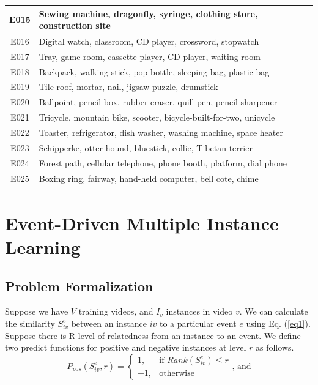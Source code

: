 \begin{table}
\begin{tabular}{|c|l|}
		E015              & Sewing machine, dragonfly, syringe, clothing store, construction site               \\ \midrule
		E016              & Digital watch, classroom, CD player, crossword, stopwatch                           \\ \midrule
		E017              & Tray, game room, cassette player, CD player, waiting room                           \\ \midrule
		E018              & Backpack, walking stick, pop bottle, sleeping bag, plastic bag                      \\ \midrule
		E019              & Tile roof, mortar, nail, jigsaw puzzle, drumstick                                   \\ \midrule
		E020              & Ballpoint, pencil box, rubber eraser, quill pen, pencil sharpener                   \\ \midrule
		E021              & Tricycle, mountain bike, scooter, bicycle-built-for-two, unicycle                   \\ \midrule
		E022              & Toaster, refrigerator, dish washer, washing machine, space heater                   \\ \midrule
		E023              & Schipperke, otter hound, bluestick, collie, Tibetan terrier                         \\ \midrule
		E024              & Forest path, cellular telephone, phone booth, platform, dial phone                  \\ \midrule
		E025              & Boxing ring, fairway, hand-held computer, bell cote, chime                          \\ \bottomrule
	\end{tabular}
		\label{table1}
\end{table}

\section{Event-Driven Multiple Instance Learning}
\label{c5_method}

\subsection{Problem Formalization} Suppose we have $V$ training videos, and $I_{v}$ instances in video $v$. We can calculate the similarity $S_{iv}^{e}$ between an instance $iv$ to a particular event $e$ using Eq. (\ref{eq1}). Suppose there is R level of relatedness from an instance to an event. We define two predict functions for positive and negative instances at level $r$ as follows.
\begin{equation}
\label{eq2}
P_{pos}(S_{iv}^{e},r) = 
\begin{cases}
1,& \text{if } Rank(S_{iv}^{e}) \leq r \\
-1,              & \text{otherwise}
\end{cases}\text{, and}
\end{equation}


